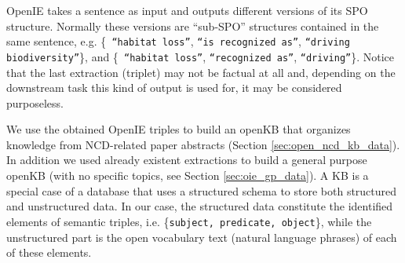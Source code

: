 \documentclass[preprint]{elsarticle}
\begin{document}
OpenIE takes a sentence as input and outputs different versions of its SPO structure. Normally these versions are ``sub-SPO'' structures contained in the same sentence, e.g. \{\texttt{
``habitat loss''}, \texttt{``is recognized as''}, \texttt{``driving biodiversity''}\}, and \{\texttt{
``habitat loss''}, \texttt{``recognized as''}, \texttt{``driving''}\}. Notice that the last extraction (triplet) may not be factual at all and, depending on the downstream task this kind of output is used for, it may be considered purposeless.  

We use the obtained OpenIE triples to build an openKB that organizes knowledge from NCD-related paper abstracts (Section \ref{sec:open_ncd_kb_data}). In addition we used already existent extractions to build a general purpose openKB (with no specific topics, see Section \ref{sec:oie_gp_data}). A KB is a special case of a database that uses a structured schema to store both structured and unstructured data. In our case, the structured data constitute the identified elements of semantic triples, i.e. \{\texttt{subject, predicate, object}\}, while the unstructured part is the open vocabulary text (natural language phrases) of each of these elements. %
\end{document}
